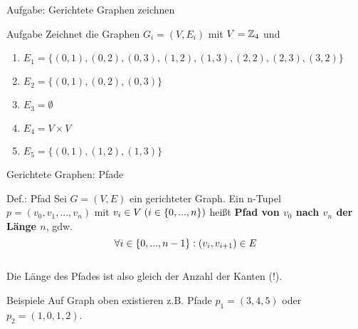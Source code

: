 \begin{frame}{Aufgabe: Gerichtete Graphen zeichnen}
	\begin{exampleblock}{Aufgabe}
		Zeichnet die Graphen $G_i = (V, E_i)$ mit $V = \mathbb{Z}_4$ und
		\begin{enumerate}
			\item $E_1 = \{(0,1), (0,2), (0,3), (1,2), (1,3), (2,2), (2,3), (3,2)\}$
			\item $E_2 = \{(0,1), (0,2), (0,3) \}$
			\item $E_3 = \emptyset$
			\item $E_4 = V \times V$
			\item $E_5 = \{(0,1), (1,2), (1,3)\}$
		\end{enumerate}
	\end{exampleblock}
	
\end{frame}

\begin{frame}{Gerichtete Graphen: Pfade}
	\begin{block}{Def.: Pfad}
		Sei $G=(V,E)$ ein gerichteter Graph. Ein n-Tupel $p=(v_0,v_1,...,v_n)$ mit $v_i \in V \; (i \in \left\{ 0,...,n \right\})$ heißt \textbf{Pfad von $v_0$ nach $v_n$ der Länge $n$}, gdw. \\
		\[
			\forall i \in \left\{ 0, ..., n-1 \right\}: (v_i, v_{i+1}) \in E
		\]
		\\[12pt]
		Die Länge des Pfades ist also gleich der Anzahl der Kanten (!).
	\end{block}

	\begin{exampleblock}{Beispiele}
		Auf Graph oben existieren z.B. Pfade $p_1=(3,4,5)$ oder $p_2=(1,0,1,2)$.
	\end{exampleblock}
\end{frame}


